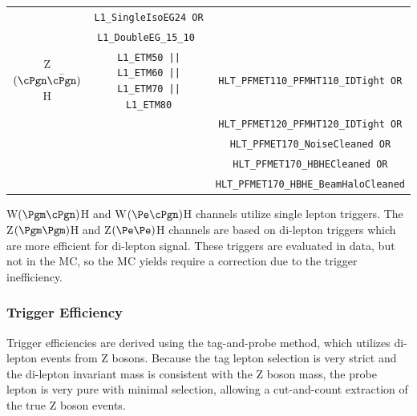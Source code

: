 \begin{table}[b]
\begin{center}
{\begin{tabular}{ccc}
                              & {\tt L1\_SingleIsoEG24   OR}  & {\tt  }         \\ 
                              & {\tt L1\_DoubleEG\_15\_10  }  & {\tt  }         \\ \hline
 Z$(\cPgn\bar{\cPgn})$H       & {\tt L1\_ETM50 || L1\_ETM60 || L1\_ETM70 || L1\_ETM80}               & {\tt HLT\_PFMET110\_PFMHT110\_IDTight OR} \\
                              & {\tt }                        & {\tt HLT\_PFMET120\_PFMHT120\_IDTight OR} \\
                              & {\tt  }                       & {\tt HLT\_PFMET170\_NoiseCleaned OR} \\
                              & {\tt  }                       & {\tt HLT\_PFMET170\_HBHECleaned OR} \\
                              & {\tt  }                       & {\tt HLT\_PFMET170\_HBHE\_BeamHaloCleaned} \\
\hline\hline
\end{tabular}
}
\end{center}
\end{table}

W$(\Pgm\cPgn)$H and W$(\Pe\cPgn)$H channels utilize single lepton triggers.  The 
Z$(\Pgm\Pgm)$H and Z$(\Pe\Pe)$H channels are based on di-lepton triggers which 
are more efficient for di-lepton signal. 
These triggers are evaluated in data, but not in the MC, so the 
MC yields require a correction due to the trigger inefficiency.


\clearpage
\subsubsection{Trigger Efficiency}

Trigger efficiencies are derived using the  tag-and-probe method, which utilizes di-lepton events from Z bosons. 
Because the tag lepton selection is very strict and the di-lepton invariant mass is consistent 
with the Z boson mass, the probe lepton is very pure with minimal selection, allowing
a cut-and-count extraction of the true Z boson events.

